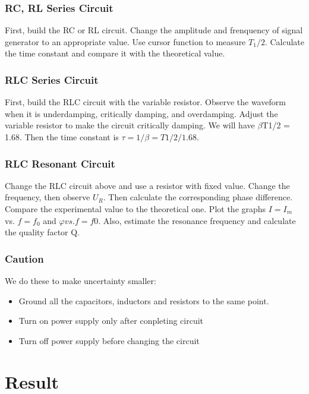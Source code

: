\documentclass[12pt,a4paper]{article}
\begin{document}
\subsubsection{RC, RL Series Circuit}
First, build the RC or RL circuit. Change the amplitude and frenquency of signal generator to an appropriate value. Use cursor function to measure $T_1/2$. Calculate the time constant and compare it with the theoretical value.

\subsubsection{RLC Series Circuit}
First, build the RLC circuit with the variable resistor. Observe the waveform when it is underdamping, critically damping, and overdamping. Adjust the variable resistor to make the circuit critically damping. We will have $\beta$T1/2 = 1.68. Then the time constant is $\tau= 1/\beta = T1/2/1.68$.

\subsubsection{RLC Resonant Circuit}
Change the RLC circuit above and use a resistor with fixed value. Change the frequency, then observe $U_R$. Then calculate the corresponding phase difference. Compare the experimental value to the theoretical one. Plot the graphs $I=I_m$ vs. $f=f_0$ and $\varphi vs. f=f0$. Also, estimate the resonance frequency and calculate the quality factor Q.

\subsubsection{Caution}
We do these to make uncertainty smaller:
\begin{itemize}
    \item Ground all the capacitors, inductors and resistors to the same point.
    \item Turn on power supply only after conpleting circuit
    \item Turn off power supply before changing the circuit
\end{itemize}


\section{Result}
\end{document}
